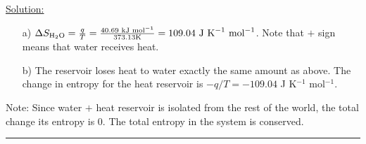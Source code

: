 \noindent
\underline{Solution:}\\

\begin{itemize}

\item[a)] $\Delta S_{\textnormal{H}_2\textnormal{O}} = \frac{q}{T} = \frac{40.69\textnormal{ kJ mol}^{-1}}{373.13\textnormal {K}} = 109.04\textnormal{ J K}^{-1}\textnormal{ mol}^{-1}$. Note that $+$ sign means that water receives heat.

\item[b)] The reservoir loses heat to water exactly the same amount as above. The change in entropy for the heat reservoir is $-q / T = -109.04$ J K$^{-1}$ mol$^{-1}$.

\end{itemize}

Note: Since water $+$ heat reservoir is isolated from the rest of the world, the total change its entropy is 0. The total entropy in the system is conserved.

\hrule\vspace{0.5cm}

